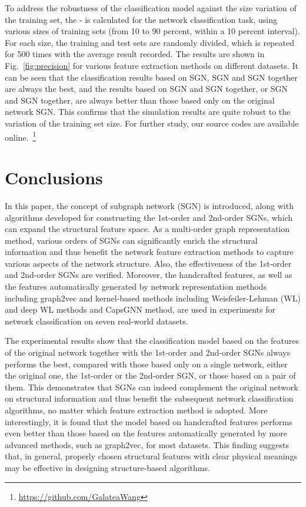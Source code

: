 \documentclass[10pt,journal,compsoc]{IEEEtran}
\begin{document}
To address the robustness of the classification model against the size variation of the training set, the - is calculated for the network classification task, using various sizes of training sets (from 10 to 90 percent, within a 10 percent interval). For each size, the training and test sets are randomly divided, which is repeated for 500 times with the average result recorded. The results are shown in Fig.~\ref{fig:precision} for various feature extraction methods on different datasets. It can be seen that the classification results based on SGN, SGN and SGN together are always the best, and the results based on SGN and SGN together, or SGN and SGN together, are always better than those based only on the original network SGN. This confirms that the simulation results are quite robust to the variation of the training set size. For further study, our source codes are available online.~\footnote{\url{https://github.com/GalateaWang}}

\section{Conclusions}\label{sec:Con}
In this paper, the concept of subgraph network (SGN) is introduced, along with algorithms developed for constructing the 1st-order and 2nd-order SGNs, which can expand the structural feature space. As a multi-order graph representation method, various orders of SGNs can significantly enrich the structural information and thus benefit the network feature extraction methods to capture various aspects of the network structure. Also, the effectiveness of the 1st-order and 2nd-order SGNs are verified. Moreover, the handcrafted features, as well as the features automatically generated by network representation methods including graph2vec and kernel-based methods including Weisfeiler-Lehman (WL) and deep WL methods and CapsGNN method, are used in experiments for network classification on seven real-world datasets.

The experimental results show that the classification model based on the features of the original network together with the 1st-order and 2nd-order SGNs always performs the best, compared with those based only on a single network, either the original one, the 1st-order or the 2nd-order SGN, or those based on a pair of them. This demonstrates that SGNs can indeed complement the original network on structural information and thus benefit the subsequent network classification algorithms, no matter which feature extraction method is adopted. More interestingly, it is found that the model based on handcrafted features performs even better than those based on the features automatically generated by more advanced methods, such as graph2vec, for most datasets. This finding suggests that, in general, properly chosen structural features with clear physical meanings may be effective in designing structure-based algorithms.
\end{document}
